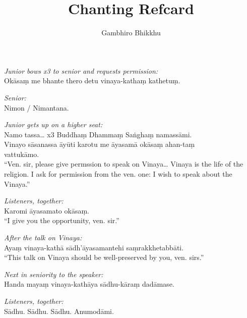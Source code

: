 \documentclass[10pt,oneside]{memoir}
\title{Chanting Refcard}
\author{Gambhiro Bhikkhu}
\begin{document}
\begin{hangparas}{1em}{1}

\emph{Junior bows x3 to senior and requests permission:}\\
Okāsaṃ me bhante thero detu vinaya-kathaṃ kathetuṃ.

\emph{Senior:}\\
Nimon / Nimantana.

\emph{Junior gets up on a higher seat:}\\
Namo tassa\ldots{} x3 Buddhaṃ Dhammaṃ Saṅghaṃ namassāmi.\\
Vinayo sāsanassa āyūti karotu me āyasamā okāsaṃ ahan-taṃ\\ vattukāmo.\\[5pt]
``Ven. sir, please give permssion to speak on Vinaya\ldots{} Vinaya is the
life of the religion. I ask for permission from the ven. one: I wish
to speak about the Vinaya.''

\emph{Listeners, together:}\\
Karomi āyasamato okāsaṃ.\\[5pt]
``I give you the opportunity, ven. sir.''

\emph{After the talk on Vinaya:}\\
Ayaṃ vinaya-kathā sādh'āyasamantehi saṃrakkhetabbāti.\\[5pt]
``This talk on Vinaya should be well-preserved by you, ven. sirs.''

\emph{Next in seniority to the speaker:}\\
Handa mayaṃ vinaya-kathāya sādhu-kāraṃ dadāmase.

\emph{Listeners, together:}\\
Sādhu. Sādhu. Sādhu. Anumodāmi.

\end{hangparas}
\end{document}
